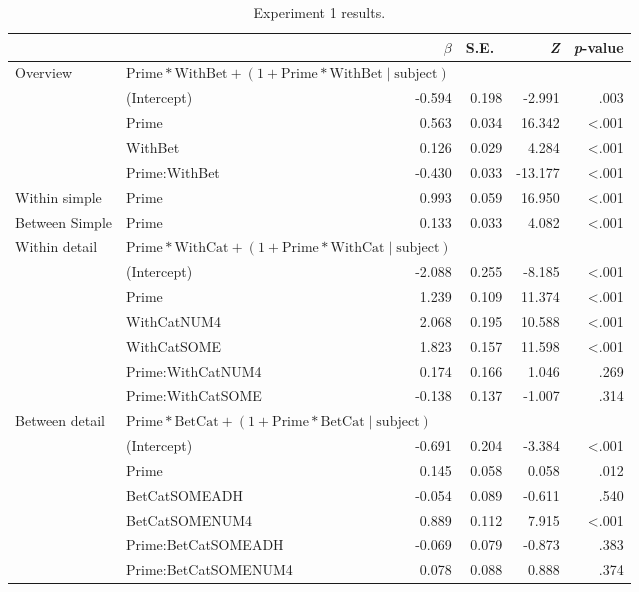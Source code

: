 \documentclass[10pt]{article}
\begin{document}
\begin{table}[h]
  \caption{Experiment 1 results.}\vspace{-20pt}
  \begin{center}
    \begin{adjustbox}{width=1.2\textwidth,center=\textwidth}
    \begin{tabular}{llrrrr}
      \hline
      & & \(\beta\) & S.E.\ & \emph{Z} & \emph{p}-value  \\
      \hline
      Overview & \multicolumn{2}{l}{\(\text{Prime} * \text{WithBet} + (1 + \text{Prime} * \text{WithBet} \mid \text{subject})\)}  & & & \\
      & (Intercept) & -0.594 & 0.198 & -2.991 & .003 \\
      & Prime & 0.563 & 0.034 & 16.342 & <.001 \\
      & WithBet & 0.126 & 0.029 & 4.284 & <.001 \\
      & Prime:WithBet & -0.430 & 0.033 & -13.177 & <.001 \\
      Within simple & Prime & 0.993 & 0.059 & 16.950 & <.001 \\
      Between Simple & Prime & 0.133 & 0.033 & 4.082 & <.001 \\
      Within detail & \multicolumn{2}{l}{\(\text{Prime} * \text{WithCat} + (1 + \text{Prime} * \text{WithCat} \mid \text{subject})\)}  & & & \\
      & (Intercept)  & -2.088 & 0.255 & -8.185 & <.001\\
      & Prime & 1.239 & 0.109 & 11.374 & <.001 \\
      & WithCatNUM4 & 2.068 & 0.195 & 10.588 & <.001 \\
      & WithCatSOME & 1.823 & 0.157 & 11.598 & <.001 \\
      & Prime:WithCatNUM4 & 0.174 & 0.166 & 1.046 & .269 \\
      & Prime:WithCatSOME & -0.138 & 0.137 & -1.007 & .314 \\
      Between detail & \multicolumn{2}{l}{\(\text{Prime} * \text{BetCat} + (1 + \text{Prime} * \text{BetCat} \mid \text{subject})\)}  & & & \\
      & (Intercept)  & -0.691 & 0.204 & -3.384 & <.001\\
      & Prime & 0.145 & 0.058 & 0.058 & .012 \\
      & BetCatSOMEADH & -0.054 & 0.089 & -0.611 & .540 \\
      & BetCatSOMENUM4 & 0.889 & 0.112 & 7.915 & <.001 \\
      & Prime:BetCatSOMEADH & -0.069 & 0.079 & -0.873 & .383 \\
      & Prime:BetCatSOMENUM4 & 0.078 & 0.088 & 0.888 & .374 \\
      \hline
    \end{tabular}
  \end{adjustbox}
  \end{center}


\end{table}
\end{document}
